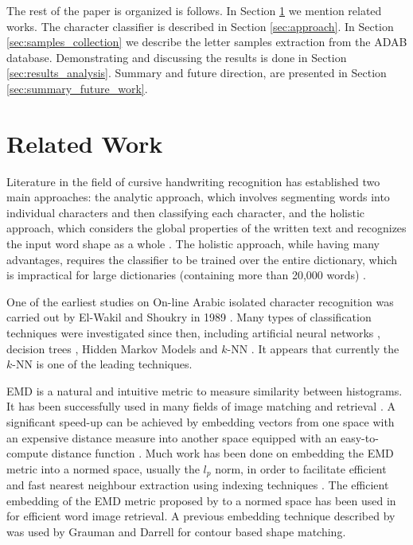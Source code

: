 \documentclass[10pt, conference, compsocconf]{IEEEtran}
\begin{document}
The rest of the paper is organized is follows. 
In Section \ref{sec:related_work} we mention related works. 
The character classifier is described in Section \ref{sec:approach}. 
In Section \ref{sec:samples_collection} we describe the letter samples extraction from the ADAB database.
Demonstrating and discussing the results is done in Section \ref{sec:results_analysis}.
Summary and future direction, are presented in Section \ref{sec:summary_future_work}. 

\section{Related Work}
\label{sec:related_work}

Literature in the field of cursive handwriting recognition has established two main approaches: the analytic approach, which involves segmenting words into individual characters and then classifying each character\cite{abdulla2008off, sari2002off, Dinges2011}, and the holistic approach, which considers the global properties of the written text and recognizes the input word shape as a whole \cite{biadsy2011segmentation, saabni2009hierarchical}. 
The holistic approach, while having many advantages, requires the classifier to be trained over the entire dictionary, which is impractical for large dictionaries (containing more than 20,000 words) \cite{elanwar2012unconstrained}.

One of the earliest studies on On-line Arabic isolated character recognition was carried out by El-Wakil and Shoukry in 1989 \cite{el1989line}.
Many types of classification techniques were investigated since then, including artificial neural networks \cite{alijla2012oiahcr,ismail2012online}, decision trees \cite{ismail2012online}, Hidden Markov Models \cite{biadsy2006online} and $k$-NN \cite{elglaly2011isolated}.
It appears that currently the $k$-NN is one of the leading techniques.

EMD is a natural and intuitive metric to measure similarity between histograms. 
It has been successfully used in many fields of image matching and retrieval \cite{grauman2004fast, rubner2000earth}.
A significant speed-up can be achieved by embedding vectors from one space with an expensive distance measure into another space equipped with an easy-to-compute distance function \cite{saabni2013efficient}. 
Much work has been done on embedding the EMD metric into a normed space, usually the $l_p$ norm, in order to facilitate efficient and fast nearest neighbour extraction using indexing techniques \cite{bourgain1985lipschitz}. 
The efficient embedding of the EMD metric proposed by \cite{shirdhonkar2008approximate} to a normed space has been used in \cite{saabni2013efficient} for efficient word image retrieval.
A previous embedding technique described by \cite{indyk2003fast} was used by Grauman and Darrell \cite{grauman2004fast} for contour based shape matching.
\end{document}
